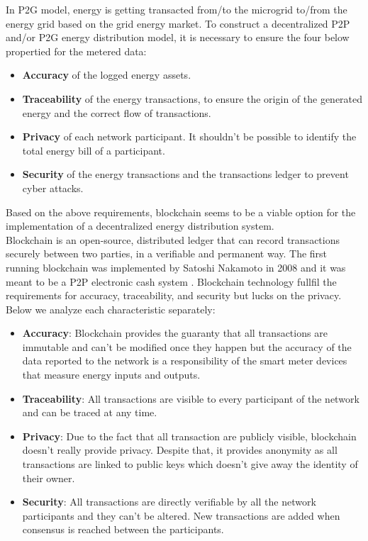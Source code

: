 In P2G model, energy is getting transacted from/to the microgrid to/from the energy grid based on the grid energy market.
To construct a decentralized P2P and/or P2G energy distribution model, it is necessary to ensure the four below propertied for the metered data:
\begin{itemize}
\item \textbf{Accuracy} of the logged energy assets.
\item \textbf{Traceability} of the energy transactions, to ensure the origin of the generated energy and the correct flow of transactions.
\item \textbf{Privacy} of each network participant. It shouldn't be possible to identify the total energy bill of a participant.
\item \textbf{Security} of the energy transactions and the transactions ledger to prevent cyber attacks. \cite{Vangulick2023}
\end{itemize}
Based on the above requirements, blockchain seems to be a viable option for the implementation of a decentralized energy distribution system.\\
Blockchain is an open-source, distributed ledger that can record transactions securely
between two parties, in a verifiable and permanent way. The first running blockchain was implemented by Satoshi Nakamoto in 2008
and it was meant to be a P2P electronic cash system \cite{Nakamoto}. Blockchain technology fullfil the requirements for accuracy, traceability,
and security but lucks on the privacy. Below we analyze each characteristic separately:
\begin{itemize}
    \item \textbf{Accuracy}: Blockchain provides the guaranty that all transactions are immutable and can't be modified once they happen but the accuracy of the data reported to the network is 
    a responsibility of the smart meter devices that measure energy inputs and outputs.
    \item \textbf{Traceability}: All transactions are visible to every participant of the network and can be traced at any time.
    \item \textbf{Privacy}: Due to the fact that all transaction are publicly visible, blockchain doesn't really provide privacy. 
    Despite that, it provides anonymity as all transactions are linked to public keys which doesn't give away the identity of their owner.
    \item \textbf{Security}: All transactions are directly verifiable by all the network participants and they can't be altered. New transactions are added when consensus is reached between the participants. \cite{Vangulick2023}
\end{itemize}

